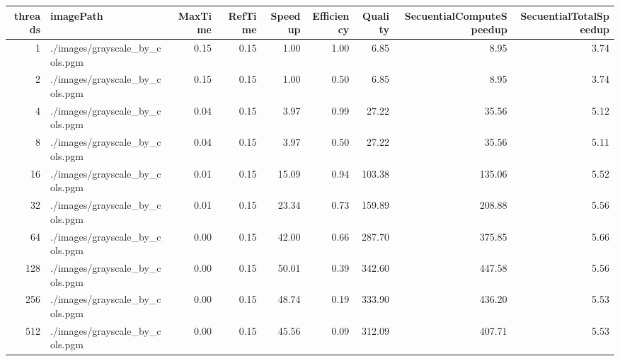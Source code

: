         \begin{table}[H]
            \centering
            \begin{adjustbox}{width=\textwidth, keepaspectratio}
                \begin{tabular}{rlrrrrrrr}
                    \toprule
                     threads &                          imagePath &  MaxTime &  RefTime &  Speedup &  Efficiency &  Quality &  SecuentialComputeSpeedup &  SecuentialTotalSpeedup \\
                    \midrule
                           1 &     ./images/grayscale\_by\_cols.pgm &     0.15 &     0.15 &     1.00 &        1.00 &     6.85 &                      8.95 &                    3.74 \\
                           2 &     ./images/grayscale\_by\_cols.pgm &     0.15 &     0.15 &     1.00 &        0.50 &     6.85 &                      8.95 &                    3.74 \\
                           4 &     ./images/grayscale\_by\_cols.pgm &     0.04 &     0.15 &     3.97 &        0.99 &    27.22 &                     35.56 &                    5.12 \\
                           8 &     ./images/grayscale\_by\_cols.pgm &     0.04 &     0.15 &     3.97 &        0.50 &    27.22 &                     35.56 &                    5.11 \\
                          16 &     ./images/grayscale\_by\_cols.pgm &     0.01 &     0.15 &    15.09 &        0.94 &   103.38 &                    135.06 &                    5.52 \\
                          32 &     ./images/grayscale\_by\_cols.pgm &     0.01 &     0.15 &    23.34 &        0.73 &   159.89 &                    208.88 &                    5.56 \\
                          64 &     ./images/grayscale\_by\_cols.pgm &     0.00 &     0.15 &    42.00 &        0.66 &   287.70 &                    375.85 &                    5.66 \\
                         128 &     ./images/grayscale\_by\_cols.pgm &     0.00 &     0.15 &    50.01 &        0.39 &   342.60 &                    447.58 &                    5.56 \\
                         256 &     ./images/grayscale\_by\_cols.pgm &     0.00 &     0.15 &    48.74 &        0.19 &   333.90 &                    436.20 &                    5.53 \\
                         512 &     ./images/grayscale\_by\_cols.pgm &     0.00 &     0.15 &    45.56 &        0.09 &   312.09 &                    407.71 &                    5.53 \\

\end{tabular}
\end{adjustbox}
\end{table}
